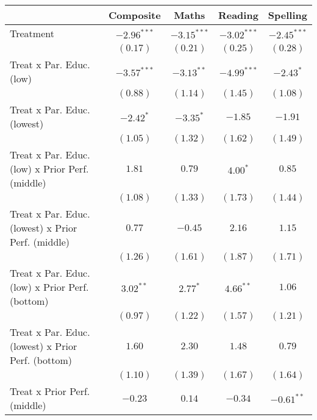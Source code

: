 
\begin{table}
\begin{center}
\begin{tabular}{l c c c c}
\hline
 & Composite & Maths & Reading & Spelling \\
\hline
Treatment                                          & $-2.96^{***}$ & $-3.15^{***}$ & $-3.02^{***}$ & $-2.45^{***}$ \\
                                                   & $(0.17)$      & $(0.21)$      & $(0.25)$      & $(0.28)$      \\
Treat x Par. Educ. (low)                           & $-3.57^{***}$ & $-3.13^{**}$  & $-4.99^{***}$ & $-2.43^{*}$   \\
                                                   & $(0.88)$      & $(1.14)$      & $(1.45)$      & $(1.08)$      \\
Treat x Par. Educ. (lowest)                        & $-2.42^{*}$   & $-3.35^{*}$   & $-1.85$       & $-1.91$       \\
                                                   & $(1.05)$      & $(1.32)$      & $(1.62)$      & $(1.49)$      \\
Treat x Par. Educ. (low) x Prior Perf. (middle)    & $1.81$        & $0.79$        & $4.00^{*}$    & $0.85$        \\
                                                   & $(1.08)$      & $(1.33)$      & $(1.73)$      & $(1.44)$      \\
Treat x Par. Educ. (lowest) x Prior Perf. (middle) & $0.77$        & $-0.45$       & $2.16$        & $1.15$        \\
                                                   & $(1.26)$      & $(1.61)$      & $(1.87)$      & $(1.71)$      \\
Treat x Par. Educ. (low) x Prior Perf. (bottom)    & $3.02^{**}$   & $2.77^{*}$    & $4.66^{**}$   & $1.06$        \\
                                                   & $(0.97)$      & $(1.22)$      & $(1.57)$      & $(1.21)$      \\
Treat x Par. Educ. (lowest) x Prior Perf. (bottom) & $1.60$        & $2.30$        & $1.48$        & $0.79$        \\
                                                   & $(1.10)$      & $(1.39)$      & $(1.67)$      & $(1.64)$      \\
Treat x Prior Perf. (middle)                       & $-0.23$       & $0.14$        & $-0.34$       & $-0.61^{**}$  \\

\end{tabular}
\end{center}
\end{table}
